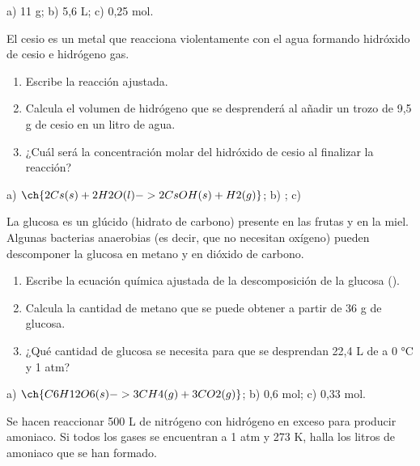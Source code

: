 \documentclass[
]{article}
\providecommand{\tightlist}{%
  \setlength{\itemsep}{0pt}\setlength{\parskip}{0pt}}
\begin{document}
\begin{solution}a) 11 g; b) 5,6 L; c) 0,25 mol.\end{solution}

\begin{exercise}[tags=SM16] El cesio es un metal que reacciona
violentamente con el agua formando hidróxido de cesio e hidrógeno gas.

\begin{enumerate}
\def\labelenumi{\alph{enumi})}
\tightlist
\item
  Escribe la reacción ajustada.
\item
  Calcula el volumen de hidrógeno que se desprenderá al añadir un trozo
  de 9,5 g de cesio en un litro de agua.
\item
  ¿Cuál será la concentración molar del hidróxido de cesio al finalizar
  la reacción?
\end{enumerate}

\end{exercise}

\begin{solution}a) \(\ch{2 Cs(s) + 2 H2O(l) -> 2 CsOH(s) + H2(g)}\); b)
; c)\end{solution}

\begin{exercise}[tags=SM16] La glucosa es un glúcido (hidrato de
carbono) presente en las frutas y en la miel. Algunas bacterias
anaerobias (es decir, que no necesitan oxígeno) pueden descomponer la
glucosa en metano y en dióxido de carbono.

\begin{enumerate}
\def\labelenumi{\alph{enumi})}
\tightlist
\item
  Escribe la ecuación química ajustada de la descomposición de la
  glucosa ().
\item
  Calcula la cantidad de metano que se puede obtener a partir de 36 g de
  glucosa.
\item
  ¿Qué cantidad de glucosa se necesita para que se desprendan 22,4 L de
   a 0 °C y 1 atm?
\end{enumerate}

\end{exercise}

\begin{solution}a) \(\ch{C6H12O6(s) -> 3 CH4(g) + 3 CO2(g)}\); b) 0,6
mol; c) 0,33 mol.\end{solution}

\begin{exercise}[tags=SM16] Se hacen reaccionar 500 L de nitrógeno con
hidrógeno en exceso para producir amoniaco. Si todos los gases se
encuentran a 1 atm y 273 K, halla los litros de amoniaco que se han
formado.\end{exercise}
\end{document}
